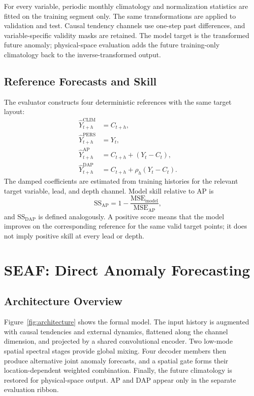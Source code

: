 \documentclass[conference]{IEEEtran}
\begin{document}
For every variable, periodic monthly climatology and normalization statistics are fitted on the training segment only. The same transformations are applied to validation and test. Causal tendency channels use one-step past differences, and variable-specific validity masks are retained. The model target is the transformed future anomaly; physical-space evaluation adds the future training-only climatology back to the inverse-transformed output.

\subsection{Reference Forecasts and Skill}
The evaluator constructs four deterministic references with the same target layout:
\begin{align}
\widehat{Y}^{\mathrm{CLIM}}_{t+h}&=C_{t+h},\\
\widehat{Y}^{\mathrm{PERS}}_{t+h}&=Y_t,\\
\widehat{Y}^{\mathrm{AP}}_{t+h}&=C_{t+h}+(Y_t-C_t),\\
\widehat{Y}^{\mathrm{DAP}}_{t+h}&=C_{t+h}+\rho_h(Y_t-C_t).
\label{eq:references}
\end{align}
The damped coefficients are estimated from training histories for the relevant target variable, lead, and depth channel. Model skill relative to AP is
\begin{equation}
\mathrm{SS}_{\mathrm{AP}}=1-\frac{\mathrm{MSE}_{\mathrm{model}}}{\mathrm{MSE}_{\mathrm{AP}}},
\label{eq:ssap}
\end{equation}
and $\mathrm{SS}_{\mathrm{DAP}}$ is defined analogously. A positive score means that the model improves on the corresponding reference for the same valid target points; it does not imply positive skill at every lead or depth.

\section{SEAF: Direct Anomaly Forecasting}

\subsection{Architecture Overview}
Figure~\ref{fig:architecture} shows the formal model. The input history is augmented with causal tendencies and external dynamics, flattened along the channel dimension, and projected by a shared convolutional encoder. Two low-mode spatial spectral stages provide global mixing. Four decoder members then produce alternative joint anomaly forecasts, and a spatial gate forms their location-dependent weighted combination. Finally, the future climatology is restored for physical-space output. AP and DAP appear only in the separate evaluation ribbon.
\end{document}
